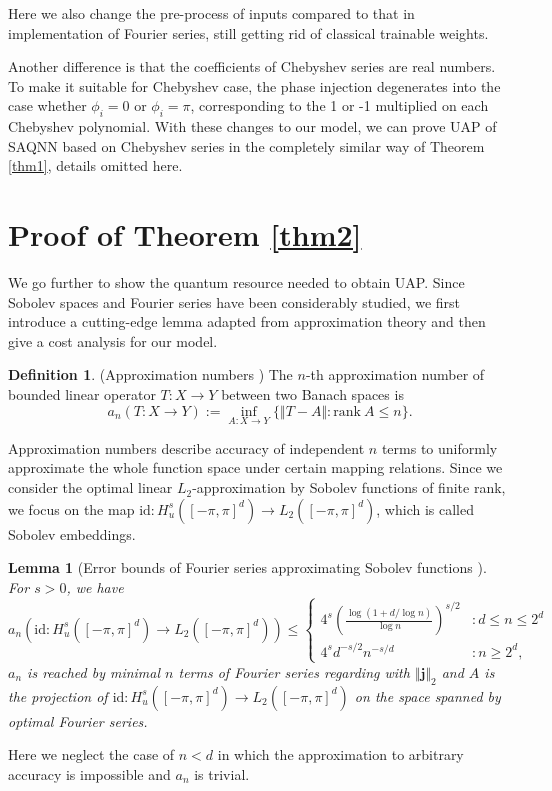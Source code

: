 \documentclass{article}
\theoremstyle{plain}
\newtheorem{lemma}[theorem]{Lemma}
\theoremstyle{definition}
\newtheorem{definition}[theorem]{Definition}
\theoremstyle{remark}
\begin{document}
Here we also change the pre-process of inputs compared to that in implementation of Fourier series, still getting rid of classical trainable weights.

Another difference is that the coefficients of Chebyshev series are real numbers. To make it suitable for Chebyshev case, the phase injection degenerates into the case whether $\phi_i = 0$ or $\phi_i = \pi$, corresponding to the 1 or -1 multiplied on each Chebyshev polynomial. With these changes to our model, we can prove UAP of SAQNN based on Chebyshev series in the completely similar way of Theorem \ref{thm1}, details omitted here.

\section{Proof of Theorem \ref{thm2}}\label{apd4}
We go further to show the quantum resource needed to obtain UAP. Since Sobolev spaces and Fourier series have been considerably studied, we first introduce a cutting-edge lemma adapted from approximation theory and then give a cost analysis for our model.
\begin{definition}(Approximation numbers \cite{kuhn2016})
    The $n$-th approximation number of bounded linear operator $T:X\rightarrow Y$ between two Banach spaces is 
    $$
    a_n(T:X\rightarrow Y) := \inf_{A:X\rightarrow Y}\{\Vert T-A\Vert:\text{rank}~A\leq n\}.
    $$
\end{definition}
Approximation numbers describe accuracy of independent $n$ terms to uniformly approximate the whole function space under certain mapping relations.
Since we consider the optimal linear $L_2$-approximation by Sobolev functions of finite rank, we focus on the map $\text{id}: H^s_u([-\pi,\pi]^d)\rightarrow L_2([-\pi,\pi]^d)$, which is called Sobolev embeddings. 
\begin{lemma}[Error bounds of Fourier series approximating Sobolev functions \cite{kuhn2016}\label{lem:error}]
    For $s>0$, we have
    $$
    a_n(\text{id}: H^s_u([-\pi,\pi]^d)\rightarrow L_2([-\pi,\pi]^d))
    \leq
    \begin{cases}
        4^s\left(\frac{\log (1+d/\log n)}{\log n}\right)^{s/2} &:d\leq n\leq 2^d\\
        4^s d^{-s/2}n^{-s/d} &: n\geq 2^d,
    \end{cases}
    $$
    $a_n$ is reached by minimal $n$ terms of Fourier series regarding with $\Vert \boldsymbol{j}\Vert_2$ and $A$ is the projection of $\text{id}: H^s_u([-\pi,\pi]^d)\rightarrow L_2([-\pi,\pi]^d)$ on the space spanned by optimal Fourier series.
\end{lemma}
Here we neglect the case of $n<d$ in which the approximation to arbitrary accuracy is impossible and $a_n$ is trivial.
\end{document}
